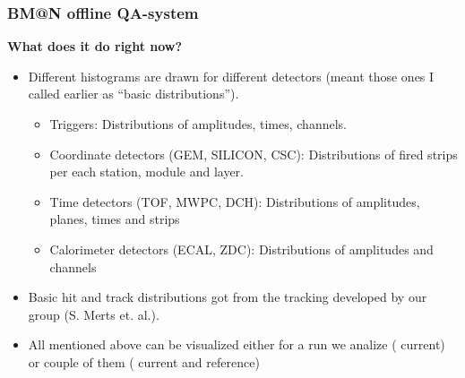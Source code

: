 \documentclass[dvipsnames] {beamer}
\begin{document}
\begin{frame}
  \bf
  \frametitle {\bf \centering BM@N offline QA-system}
  \begin{block}{\bf \centering What does it do right now?}
    \begin{itemize}
    \item Different histograms are drawn for different detectors (meant those ones I called earlier as ``basic distributions'').
      \begin{itemize}
      \item {\color{blue} Triggers:} {\color{red} Distributions of amplitudes, times, channels.}
      \item {\color{blue} Coordinate detectors (GEM, SILICON, CSC):} {\color{red} Distributions of fired strips per each station, module and layer.}
      \item {\color{blue} Time detectors (TOF, MWPC, DCH):} {\color{red} Distributions of amplitudes, planes, times and strips}
      \item {\color{blue} Calorimeter detectors (ECAL, ZDC):} {\color{red} Distributions of amplitudes and channels}
      \end{itemize}
    \item Basic hit and track distributions got from the tracking developed by our group (S. Merts et. al.). 
    \item All mentioned above can be visualized either for a run we analize ({\color{blue} current}) or couple of them ({\color{blue} current}
    and {\color{red} reference})
    \end{itemize}
  \end{block} 
\end{frame}
\end{document}
